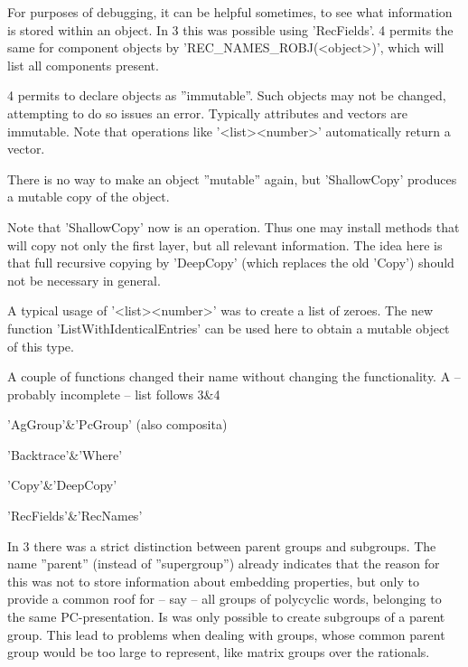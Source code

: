 For purposes of debugging, it can be helpful sometimes, to see what
information is stored within an object. In {\GAP}3 this was possible using
'RecFields'. {\GAP}4 permits the same for component objects by
'REC_NAMES_ROBJ(<object>)', which will list all components present.


{\GAP}4 permits to declare objects as ''immutable''. Such objects may not
be changed, attempting to do so issues an error. Typically attributes and
vectors are immutable. Note that operations like '<list>\*<number>'
automatically return a vector.

There is no way to make an object ''mutable'' again, but 'ShallowCopy'
produces a mutable copy of the object.

Note that 'ShallowCopy' now is an operation. Thus one may install methods
that will copy not only the first layer, but all relevant information.
The idea here is that full recursive copying by 'DeepCopy' (which replaces
the old 'Copy') should not be necessary in general.

A typical usage of '<list>\*<number>' was to create a list of zeroes. The
new function 'ListWithIdenticalEntries' can be used here to obtain a mutable
object of this type.


A couple of functions changed their name without changing the
functionality. A -- probably incomplete -- list follows
\beginitems
{\GAP}3&{\GAP}4

'AgGroup'&'PcGroup' (also composita)

'Backtrace'&'Where'

'Copy'&'DeepCopy'

'RecFields'&'RecNames'

\enditems


In {\GAP}3 there was a strict distinction between parent groups and
subgroups. The name ''parent'' (instead of ''supergroup'')
already indicates that the reason for this
was not to store information about embedding properties, but only to provide
a common roof for -- say -- all groups of polycyclic words, belonging to the
same PC-presentation. Is was only possible to create subgroups of
a parent group.
This lead to problems when dealing with groups, whose common parent group
would be too large to represent, like matrix groups over the rationals.


